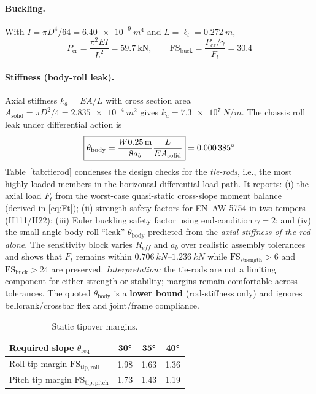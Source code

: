 \documentclass[letterpaper, 10 pt, conference]{ieeeconf}  %
\begin{document}
\paragraph*{Buckling.}
With \(I=\pi D^4/64=\SI{6.40e-9}{m^4}\) and \(L=\ell_t=\SI{0.272}{m}\),
\[
P_{\mathrm{cr}}=\frac{\pi^2 E I}{L^2}
=\SI{59.7}{\kilo\newton},\qquad
\text{FS}_{\text{buck}}=\frac{P_{\mathrm{cr}}/\gamma}{F_t}=\mathbf{30.4}
\]


\paragraph*{Stiffness (body-roll leak).}
Axial stiffness \(k_a=EA/L\) with cross section area \(A_{\text{solid}}=\pi D^2/4=\SI{2.835e-4}{m^2}\) gives \(k_a=\SI{7.3e7}{N/m}\).
The chassis roll leak under differential action is
\[
\boxed{\theta_{\mathrm{body}}=\frac{W \SI{0.25}{\meter}}{8 a_b}\frac{L}{E A_{\text{solid}}}}
=\ang{0.000385}
\]
Table~\ref{tab:tierod} condenses the design checks for the \emph{tie-rods}, i.e., the most highly loaded members in the horizontal differential load path. It reports:
(i) the axial load \(F_t\) from the worst-case quasi-static cross-slope moment balance (derived in \eqref{eq:Ft});
(ii) strength safety factors for EN~AW-5754 in two tempers (H111/H22);
(iii) Euler buckling safety factor using end-condition \(\gamma=2\);
and (iv) the small-angle body-roll “leak” \(\theta_{\mathrm{body}}\) predicted from the \emph{axial stiffness of the rod alone}.
The sensitivity block varies \(R_{\!eff}\) and \(a_b\) over realistic assembly tolerances and shows that \(F_t\) remains within \(\SIrange{0.706}{1.236}{kN}\) while \(\mathrm{FS}_{\text{strength}}>6\) and \(\mathrm{FS}_{\text{buck}}>24\) are preserved. 
\emph{Interpretation:} the tie-rods are not a limiting component for either strength or stability; margins remain comfortable across tolerances. The quoted \(\theta_{\mathrm{body}}\) is a \textbf{lower bound} (rod-stiffness only) and ignores bellcrank/crossbar flex and joint/frame compliance.

\begin{table}[htbp]
        \centering
        \footnotesize
        \caption{Static tipover margins.}
        \label{tab:stability_fos}
        \begin{tabular}{@{}lccc@{}}
        \hline
        Required slope $\theta_{\mathrm{req}}$ & \ang{30} & \ang{35} & \ang{40} \\
        \hline
        Roll tip margin $\mathrm{FS}_{\mathrm{tip,roll}}$ & 1.98 & 1.63 & 1.36 \\
        Pitch tip margin $\mathrm{FS}_{\mathrm{tip,pitch}}$ & 1.73 & 1.43 & 1.19 \\
        \hline
        \end{tabular}
\end{table}    
\end{document}
